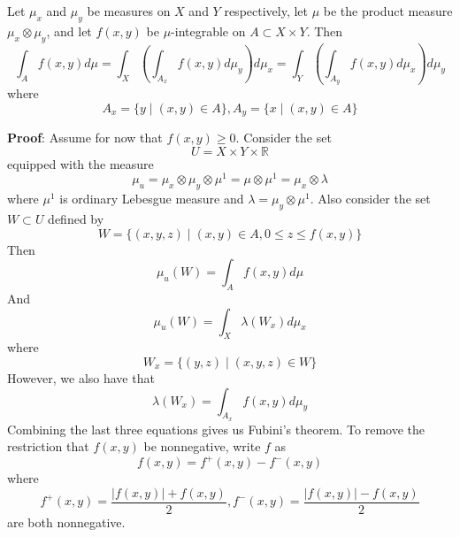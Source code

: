\documentclass[12pt]{article}
\begin{document}
Let $\mu_x$ and $\mu_y$ be measures on $X$ and $Y$ respectively, let $\mu$ be the product measure $\mu_x \otimes \mu_y$, and let $f(x,y)$ be $\mu$-integrable on $A\subset X\times Y$. Then 
\[ \int_A f(x,y) d\mu = \int_X\left(\int_{A_x} f(x,y) d\mu_y\right) d\mu_x = \int_Y\left(\int_{A_y} f(x,y) d\mu_x\right) d\mu_y\]
where 
\[A_x = \{y\mid (x,y)\in A\} , A_y = \{x\mid (x,y)\in A\}\]

\textbf{Proof}: Assume for now that $f(x,y)\geq 0$. Consider the set
\[U = X\times Y\times\mathbb{R}\]
equipped with the measure
\[\mu_u = \mu_x \otimes \mu_y \otimes \mu^1 = \mu \otimes \mu^1 = \mu_x \otimes \lambda\]
where $\mu^1$ is ordinary Lebesgue measure and $\lambda = \mu_y \otimes \mu^1$. Also consider the set $W\subset U$ defined by 
\[W = \{(x,y,z)\mid (x,y)\in A, 0\leq z\leq f(x,y)\}\]
Then
\[\mu_{u}\left(W\right) = \int_A f(x,y) d\mu\]
And
\[\mu_{u}\left(W\right) = \int_X \lambda\left(W_x\right) d\mu_x\]
where
\[W_x = \{(y,z)\mid (x,y,z)\in W\}\]
However, we also have that 
\[\lambda\left(W_x\right) = \int_{A_x} f(x,y) d\mu_y\]
Combining the last three equations gives us Fubini's theorem. To remove the restriction that $f(x,y)$ be nonnegative, write $f$ as 
\[f(x,y) = f^{+}(x,y) - f^{-}(x,y)\]
where
\[f^{+}(x,y) = \frac{\vert f(x,y)\vert + f(x,y)}{2}, f^{-}(x,y) = \frac{\vert f(x,y)\vert - f(x,y)}{2}\]
are both nonnegative.
\end{document}
